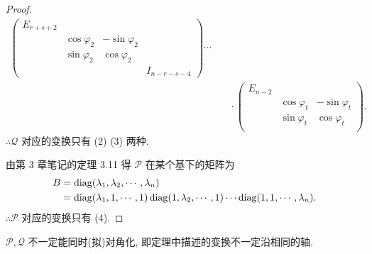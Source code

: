 \documentclass[color=black,device=normal,lang=cn,mode=geye]{elegantnote}
\begin{document}
\begin{proof}
\begin{align*}
\begin{pmatrix}
            E_{r+s+2} \\
            & \cos\varphi_2 & -\sin\varphi_2 \\
            & \sin\varphi_2 & \cos\varphi_2 \\
            &&& I_{n-r-s-4}
        \end{pmatrix}\cdots \\
        & \quad\cdot\begin{pmatrix}
            E_{n-2} \\
            & \cos\varphi_t & -\sin\varphi_t \\
            & \sin\varphi_t & \cos\varphi_t \\
        \end{pmatrix}.
    \end{align*}
    $\therefore\mathcal{Q}$ 对应的变换只有 (2) (3) 两种.

    由第 3 章笔记的定理 3.11 得 $\mathcal{P}$ 在某个基下的矩阵为
    \begin{align*}
        B & =\operatorname{diag} (\lambda_1,\lambda_2,\cdots,\lambda_n) \\
        & =\operatorname{diag} (\lambda_1,1,\cdots,1)\operatorname{diag} (1,\lambda_2,\cdots,1)\cdots\operatorname{diag} (1,1,\cdots,\lambda_n).
    \end{align*}
    $\therefore\mathcal{P}$ 对应的变换只有 (4).
\end{proof}
\begin{note}
    $\mathcal{P},\mathcal{Q}$ 不一定能同时(拟)对角化, 即定理中描述的变换不一定沿相同的轴.
\end{note}
\end{document}
